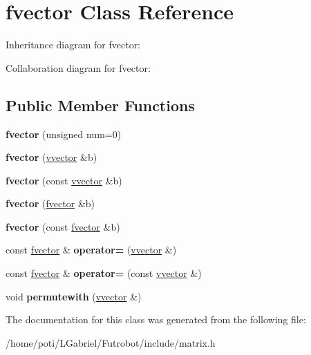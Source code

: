 \hypertarget{classfvector}{}\section{fvector Class Reference}
\label{classfvector}


Inheritance diagram for fvector\+:


Collaboration diagram for fvector\+:
\subsection*{Public Member Functions}
\begin{DoxyCompactItemize}
\item 
{\bfseries fvector} (unsigned num=0)\hypertarget{classfvector_ae0b836b084d0fcbd1442dd7d4bcf1e29}{}\label{classfvector_ae0b836b084d0fcbd1442dd7d4bcf1e29}

\item 
{\bfseries fvector} (\hyperlink{classvvector}{vvector} \&b)\hypertarget{classfvector_a232e8f609b1b4b2def5dfd89bca1b6bd}{}\label{classfvector_a232e8f609b1b4b2def5dfd89bca1b6bd}

\item 
{\bfseries fvector} (const \hyperlink{classvvector}{vvector} \&b)\hypertarget{classfvector_a7fc17b78ed3a7ddba44519a174488617}{}\label{classfvector_a7fc17b78ed3a7ddba44519a174488617}

\item 
{\bfseries fvector} (\hyperlink{classfvector}{fvector} \&b)\hypertarget{classfvector_aea9222ab1990dc882c9ca3c4d4dd5537}{}\label{classfvector_aea9222ab1990dc882c9ca3c4d4dd5537}

\item 
{\bfseries fvector} (const \hyperlink{classfvector}{fvector} \&b)\hypertarget{classfvector_a333907de11c5b5447e75b930339536d5}{}\label{classfvector_a333907de11c5b5447e75b930339536d5}

\item 
const \hyperlink{classfvector}{fvector} \& {\bfseries operator=} (\hyperlink{classvvector}{vvector} \&)\hypertarget{classfvector_a4018e9c2a4d2dc47e9245477655b8467}{}\label{classfvector_a4018e9c2a4d2dc47e9245477655b8467}

\item 
const \hyperlink{classfvector}{fvector} \& {\bfseries operator=} (const \hyperlink{classvvector}{vvector} \&)\hypertarget{classfvector_a2708dd77b6b1cee7768b47aa41cbf5ef}{}\label{classfvector_a2708dd77b6b1cee7768b47aa41cbf5ef}

\item 
void {\bfseries permutewith} (\hyperlink{classvvector}{vvector} \&)\hypertarget{classfvector_a051578c1d90fdb633e802a026a5ccb3b}{}\label{classfvector_a051578c1d90fdb633e802a026a5ccb3b}

\end{DoxyCompactItemize}


The documentation for this class was generated from the following file\+:\begin{DoxyCompactItemize}
\item 
/home/poti/\+L\+Gabriel/\+Futrobot/include/matrix.\+h\end{DoxyCompactItemize}
